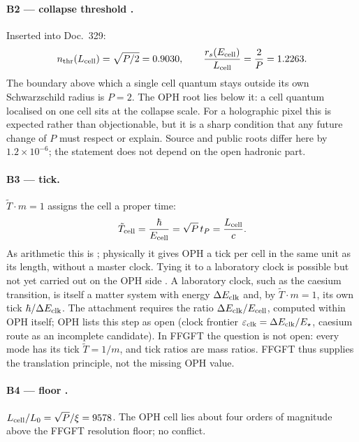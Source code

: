 \paragraph{B2 --- collapse threshold \BM.} Inserted into Doc.~329:
\begin{equation}
  n_{\rm thr}(L_{\rm cell})=\sqrt{P/2}=0.9030,\qquad
  \frac{r_s(E_{\rm cell})}{L_{\rm cell}}=\frac2P=1.2263 .
\end{equation}
The boundary above which a single cell quantum stays outside its own
Schwarzschild radius is $P=2$. The OPH root lies below it: a cell quantum
localised on one cell sits at the collapse scale. For a holographic pixel this
is expected rather than objectionable, but it is a sharp condition that any
future change of $P$ must respect or explain. Source and public roots differ
here by $1.2\times10^{-6}$; the statement does not depend on the open hadronic
part.

\paragraph{B3 --- tick.} $\tilde T\cdot m=1$ assigns the cell a proper time:
\begin{equation}
  \tilde T_{\rm cell}=\frac{\hbar}{E_{\rm cell}}=\sqrt P\,t_P=\frac{L_{\rm cell}}{c}.
\end{equation}
As arithmetic this is \BM; physically it gives OPH a tick per cell in the same
unit as its length, without a master clock. Tying it to a laboratory clock
is possible but not yet carried out on the OPH side \SM. A laboratory clock,
such as the caesium transition, is itself a matter system with energy
$\Delta E_{\rm clk}$ and, by $\tilde T\cdot m=1$, its own tick $\hbar/\Delta E_{\rm clk}$.
The attachment requires the ratio $\Delta E_{\rm clk}/E_{\rm cell}$, computed within
OPH itself; OPH lists this step as open (clock frontier
$\varepsilon_{\rm clk}=\Delta E_{\rm clk}/E_\star$, caesium route as an incomplete
candidate). In FFGFT the question is not open: every mode has its tick
$\tilde T=1/m$, and tick ratios are mass ratios. FFGFT thus supplies the
translation principle, not the missing OPH value.

\paragraph{B4 --- floor \KM.} $L_{\rm cell}/L_0=\sqrt P/\xi=9578$. The OPH
cell lies about four orders of magnitude above the FFGFT resolution floor; no
conflict.

